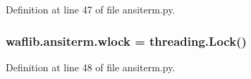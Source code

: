 Definition at line 47 of file ansiterm.\+py.

\subsubsection[{\texorpdfstring{wlock}{wlock}}]{\setlength{\rightskip}{0pt plus 5cm}waflib.\+ansiterm.\+wlock = threading.\+Lock()}\hypertarget{namespacewaflib_1_1ansiterm_a36db5a59deafb158699cfb5adaba0fa9}{}\label{namespacewaflib_1_1ansiterm_a36db5a59deafb158699cfb5adaba0fa9}


Definition at line 48 of file ansiterm.\+py.

